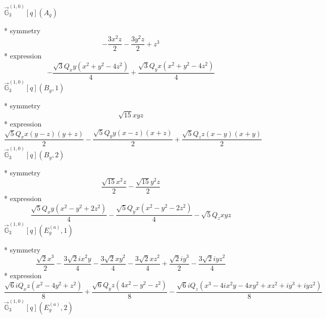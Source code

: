 \documentclass[fleqn,8pt]{jsarticle}
\begin{document}
\noindent\quad $\vec{\mathbb{G}}_{3}^{(1,0)}[q](A_{g})$

\noindent\quad ** symmetry
\begin{dmath*}
- \frac{3 x^{2} z}{2} - \frac{3 y^{2} z}{2} + z^{3}
\end{dmath*}
\noindent\quad ** expression
\begin{dmath*}
- \frac{\sqrt{3} Q_{x} y \left(x^{2} + y^{2} - 4 z^{2}\right)}{4} + \frac{\sqrt{3} Q_{y} x \left(x^{2} + y^{2} - 4 z^{2}\right)}{4}
\end{dmath*}
\noindent\quad $\vec{\mathbb{G}}_{3}^{(1,0)}[q](B_{g},1)$

\noindent\quad ** symmetry
\begin{dmath*}
\sqrt{15} x y z
\end{dmath*}
\noindent\quad ** expression
\begin{dmath*}
\frac{\sqrt{5} Q_{x} x \left(y - z\right) \left(y + z\right)}{2} - \frac{\sqrt{5} Q_{y} y \left(x - z\right) \left(x + z\right)}{2} + \frac{\sqrt{5} Q_{z} z \left(x - y\right) \left(x + y\right)}{2}
\end{dmath*}
\noindent\quad $\vec{\mathbb{G}}_{3}^{(1,0)}[q](B_{g},2)$

\noindent\quad ** symmetry
\begin{dmath*}
\frac{\sqrt{15} x^{2} z}{2} - \frac{\sqrt{15} y^{2} z}{2}
\end{dmath*}
\noindent\quad ** expression
\begin{dmath*}
\frac{\sqrt{5} Q_{x} y \left(x^{2} - y^{2} + 2 z^{2}\right)}{4} - \frac{\sqrt{5} Q_{y} x \left(x^{2} - y^{2} - 2 z^{2}\right)}{4} - \sqrt{5} Q_{z} x y z
\end{dmath*}
\noindent\quad $\vec{\mathbb{G}}_{3}^{(1,0)}[q](E_{g}^{(a)},1)$

\noindent\quad ** symmetry
\begin{dmath*}
\frac{\sqrt{2} x^{3}}{2} - \frac{3 \sqrt{2} i x^{2} y}{4} - \frac{3 \sqrt{2} x y^{2}}{4} - \frac{3 \sqrt{2} x z^{2}}{4} + \frac{\sqrt{2} i y^{3}}{2} - \frac{3 \sqrt{2} i y z^{2}}{4}
\end{dmath*}
\noindent\quad ** expression
\begin{dmath*}
\frac{\sqrt{6} i Q_{x} z \left(x^{2} - 4 y^{2} + z^{2}\right)}{8} + \frac{\sqrt{6} Q_{y} z \left(4 x^{2} - y^{2} - z^{2}\right)}{8} - \frac{\sqrt{6} i Q_{z} \left(x^{3} - 4 i x^{2} y - 4 x y^{2} + x z^{2} + i y^{3} + i y z^{2}\right)}{8}
\end{dmath*}
\noindent\quad $\vec{\mathbb{G}}_{3}^{(1,0)}[q](E_{g}^{(a)},2)$
\end{document}
